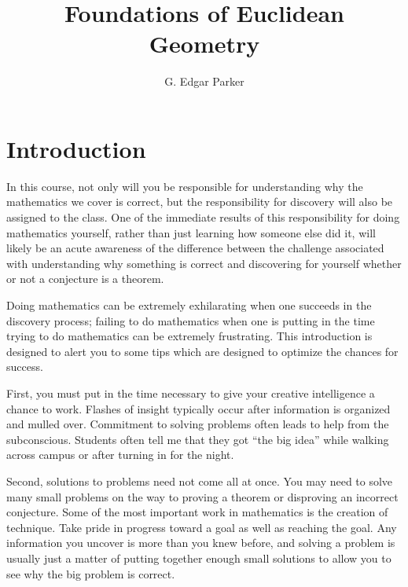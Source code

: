 \documentclass{article}
\let\titlepageAuthor\author
\renewcommand{\author}[1]{\newcommand{\headerAuthor}{#1}\titlepageAuthor{#1}}
\let\titlepageTitle\title
\renewcommand{\title}[1]{\newcommand{\headerTitle}{#1}\titlepageTitle{#1}}
\begin{document}
\title{Foundations of Euclidean Geometry}
\author{G. Edgar Parker}
\date{ }
\maketitle
\thispagestyle{empty}



\newpage

\setcounter{tocdepth}{3} 
\tableofcontents
\thispagestyle{empty}


\newpage

\section{Introduction}


In this course, not only will you be responsible for understanding why the mathematics we cover is correct, but the responsibility for discovery will also be assigned to the class. One of the immediate results of this responsibility for doing mathematics yourself, rather than just learning how someone else did it, will likely be an acute awareness of the difference between the challenge associated with understanding why something is correct and discovering for yourself whether or not a conjecture is a theorem.

Doing mathematics can be extremely exhilarating when one succeeds in the discovery process; failing to do mathematics when one is putting in the time trying to do mathematics can be extremely frustrating. This introduction is designed to alert you to some tips which are designed to optimize the chances for success.

First, you must put in the time necessary to give your creative intelligence a chance to work. Flashes of insight typically occur after information is organized and mulled over. Commitment to solving problems often leads to help from the subconscious. Students often tell me that they got ``the big idea'' while walking across campus or after turning in for the night.

Second, solutions to problems need not come all at once. You may need to solve many small problems on the way to proving a theorem or disproving an incorrect conjecture. Some of the most important work in mathematics is the creation of technique. Take pride in progress toward a goal as well as reaching the goal. Any information you uncover is more than you knew before, and solving a problem is usually just a matter of putting together enough small solutions to allow you to see why the big problem is correct.
\end{document}
